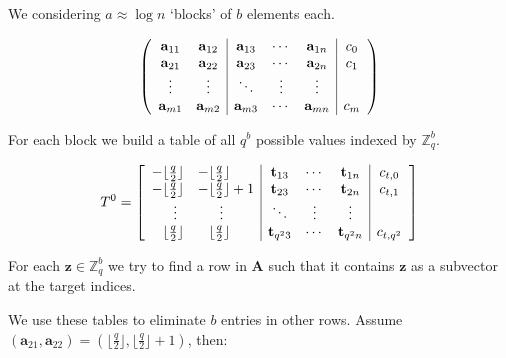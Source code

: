 \documentclass[10pt]{beamer}
\renewcommand{\vec}[1]{\mathbf{#1}\xspace}
\newcommand{\Z}{\ensuremath{\mathbb{Z}}\xspace}
\begin{document}
\begin{frame}
\framebreak

We considering $a \approx \log n$ `blocks' of $b$ elements each.

\begin{equation*}
\left(
\begin{array}{cc|ccc|c}
\bold{a}_{11} & \bold{a}_{12} & \bold{a}_{13} & \cdots & \bold{a}_{1n} & c_0\\
\bold{a}_{21} & \bold{a}_{22} & \bold{a}_{23} & \cdots & \bold{a}_{2n} & c_1\\
\vdots & \vdots & \ddots & \vdots & \vdots\\
\bold{a}_{m1} & \bold{a}_{m2} & \bold{a}_{m3} & \cdots & \bold{a}_{mn} & c_{m}
\end{array}
\right)
\end{equation*}

\framebreak

For each block we build a table of all $q^b$ possible values indexed by $\Z_q^b$.

\begin{equation*}
T^0 = \left[ 
\begin{array}{ll|ccc|c}
-\lfloor\frac{q}{2}\rfloor & -\lfloor\frac{q}{2}\rfloor & \bold{t}_{13} & \cdots & \bold{t}_{1n} & c_{t,0}\\
-\lfloor\frac{q}{2}\rfloor & -\lfloor\frac{q}{2}\rfloor+1 & \bold{t}_{23} & \cdots & \bold{t}_{2n} & c_{t,1}\\
\phantom{--}\vdots & \phantom{--}\vdots & \ddots & \vdots & \vdots\\
\phantom{-}\lfloor\frac{q}{2}\rfloor & \phantom{-}\lfloor\frac{q}{2}\rfloor& \bold{t}_{q^23} & \cdots & \bold{t}_{q^2n} & c_{t,q^2}
\end{array}\right]
\end{equation*}

For each $\vec{z} \in \Z_q^b$ we try to find a row in $\vec{A}$ such that it contains $\vec{z}$ as a subvector at the target indices.

\framebreak

We use these tables to eliminate $b$ entries in other rows. Assume $(\vec{a}_{21},\vec{a}_{22}) = (\lfloor\frac{q}{2}\rfloor, \lfloor\frac{q}{2}\rfloor+1)$, then:


\end{frame}
\end{document}
